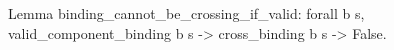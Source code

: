 Lemma binding_cannot_be_crossing_if_valid:
  forall b s, valid_component_binding b s ->
              cross_binding b s -> False.